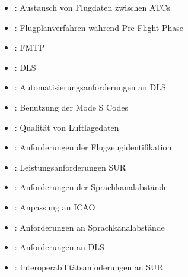     \begin{itemize}
        \item {}\textdagger:  Austausch von Flugdaten zwischen \acp{ATC} %
        \item {}\textdagger:  Flugplanverfahren während Pre-Flight Phase %
        \item {}\textdagger:   \acf{FMTP} %
        \item {}\textdagger:    \acf{DLS} %
        \item {}\textdagger:    Automatisierungsanforderungen an \ac{DLS} %
        \item {}\textdagger:   Benutzung der Mode S Codes %
        \item {}\textdagger:    Qualität von Luftlagedaten %
        \item {}\textdagger:  Anforderungen der Flugzeugidentifikation %
        \item {}\textdagger:  Leistungsanforderungen \ac{SUR} %
        \item {}\textdagger:  Anforderungen der Sprachkanalabstände %
        \item {}\textdagger:   Anpassung  an \acs{ICAO} %
        \item {}\textdagger:   Anforderungen an Sprachkanalabstände %
        \item {}\textdagger:   Anforderungen an \acf{DLS} %
        \item {}\textdagger:  Interoperabilitätsanfoderungen an \acs{SUR} %

\end{itemize}
